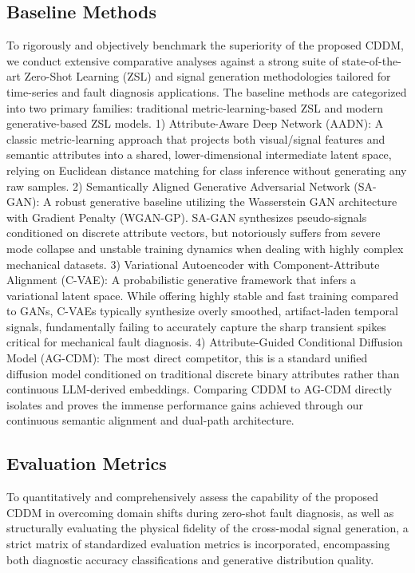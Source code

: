 \subsection{Baseline Methods}
To rigorously and objectively benchmark the superiority of the proposed CDDM, we conduct extensive comparative analyses against a strong suite of state-of-the-art Zero-Shot Learning (ZSL) and signal generation methodologies tailored for time-series and fault diagnosis applications. The baseline methods are categorized into two primary families: traditional metric-learning-based ZSL and modern generative-based ZSL models.
1) Attribute-Aware Deep Network (AADN): A classic metric-learning approach that projects both visual/signal features and semantic attributes into a shared, lower-dimensional intermediate latent space, relying on Euclidean distance matching for class inference without generating any raw samples.
2) Semantically Aligned Generative Adversarial Network (SA-GAN): A robust generative baseline utilizing the Wasserstein GAN architecture with Gradient Penalty (WGAN-GP). SA-GAN synthesizes pseudo-signals conditioned on discrete attribute vectors, but notoriously suffers from severe mode collapse and unstable training dynamics when dealing with highly complex mechanical datasets.
3) Variational Autoencoder with Component-Attribute Alignment (C-VAE): A probabilistic generative framework that infers a variational latent space. While offering highly stable and fast training compared to GANs, C-VAEs typically synthesize overly smoothed, artifact-laden temporal signals, fundamentally failing to accurately capture the sharp transient spikes critical for mechanical fault diagnosis.
4) Attribute-Guided Conditional Diffusion Model (AG-CDM): The most direct competitor, this is a standard unified diffusion model conditioned on traditional discrete binary attributes rather than continuous LLM-derived embeddings. Comparing CDDM to AG-CDM directly isolates and proves the immense performance gains achieved through our continuous semantic alignment and dual-path architecture.

\subsection{Evaluation Metrics}
To quantitatively and comprehensively assess the capability of the proposed CDDM in overcoming domain shifts during zero-shot fault diagnosis, as well as structurally evaluating the physical fidelity of the cross-modal signal generation, a strict matrix of standardized evaluation metrics is incorporated, encompassing both diagnostic accuracy classifications and generative distribution quality.

